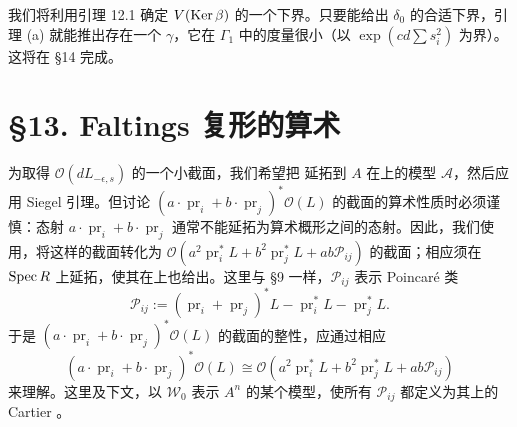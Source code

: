 我们将利用引理 12.1 确定 $V(\operatorname{Ker}\beta)$ 的一个下界。只要能给出 $\delta_0$ 的合适下界，引理 (a) 就能推出存在一个 $\gamma$，它在 $\Gamma_1$ 中的度量很小（以 $\exp(cd\sum s_i^2)$ 为界）。这将在 §14 完成。

\section*{§13. Faltings 复形的算术}
为取得 $\mathcal O(dL_{-\epsilon,s})$ 的一个小截面，我们希望把 延拓到 $A$ 在上的模型 $\mathscr A$，然后应用 Siegel 引理。但讨论 $(a\cdot\operatorname{pr}_i+b\cdot\operatorname{pr}_j)^*\mathcal O(L)$ 的截面的算术性质时必须谨慎：态射 $a\cdot\operatorname{pr}_i+b\cdot\operatorname{pr}_j$ 通常不能延拓为算术概形之间的态射。因此，我们使用，将这样的截面转化为 $\mathcal O(a^2\operatorname{pr}_i^*L+b^2\operatorname{pr}_j^*L+ab\mathscr P_{ij})$ 的截面；相应须在 $\operatorname{Spec} R$ 上延拓，使其在上也给出。这里与 §9 一样，$\mathscr P_{ij}$ 表示 Poincaré 类
\[
\mathscr P_{ij}:=(\operatorname{pr}_i+\operatorname{pr}_j)^*L-\operatorname{pr}_i^*L-\operatorname{pr}_j^*L.
\]
于是 $(a\cdot\operatorname{pr}_i+b\cdot\operatorname{pr}_j)^*\mathcal O(L)$ 的截面的整性，应通过相应
\begin{equation*}\tag{13.1}
(a\cdot\operatorname{pr}_i+b\cdot\operatorname{pr}_j)^*\mathcal O(L)
\cong\mathcal O(a^2\operatorname{pr}_i^*L+b^2\operatorname{pr}_j^*L+ab\mathscr P_{ij})
\end{equation*}
来理解。这里及下文，以 $\mathscr W_0$ 表示 $A^n$ 的某个模型，使所有 $\mathscr P_{ij}$ 都定义为其上的 Cartier 。
